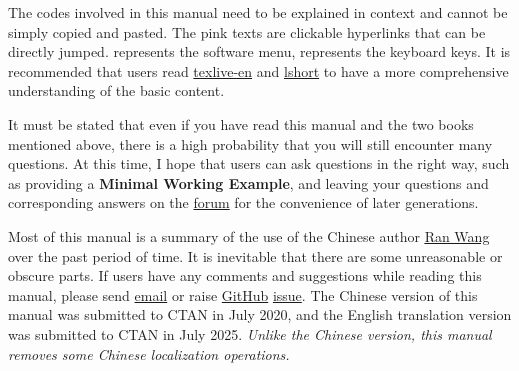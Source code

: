 The codes involved in this manual need to be explained in context
and cannot be simply copied and pasted.
The pink texts are clickable hyperlinks that can be directly jumped.
 represents the software menu,  represents the keyboard keys.
It is recommended that users read
\href{https://tug.org/texlive/doc/texlive-en/texlive-en.pdf}{\textsf{texlive-en}}
and
\href{http://mirrors.ctan.org/info/lshort/english/lshort.pdf}{\textsf{lshort}}
to have a more comprehensive understanding of the basic content.

It must be stated that even if you have read this manual
and the two books mentioned above,
there is a high probability that you will still encounter many questions.
At this time, I hope that users can ask questions in the right way,
such as providing a \textbf{Minimal Working Example},
and leaving your questions and corresponding answers on the
\href{https://tex.stackexchange.com/}{forum}
for the convenience of later generations.

Most of this manual is a summary of the use of the Chinese author
\href{https://github.com/OsbertWang}{\underline{Ran Wang}}
over the past period of time.
It is inevitable that there are some unreasonable or obscure parts.
If users have any comments and suggestions while reading this manual,
please send \href{mailto:myhsia@outlook.com}{email} or raise
\href{https://github.com/myhsia/install-latex-guide-en}{GitHub}
\href{https://github.com/OsbertWang/install-latex-guide-en/issues}{issue}.
The Chinese version of this manual was submitted to CTAN in July 2020, and the English translation version was submitted to CTAN in July 2025.
\emph{Unlike the Chinese version,
this manual removes some Chinese localization operations.}

